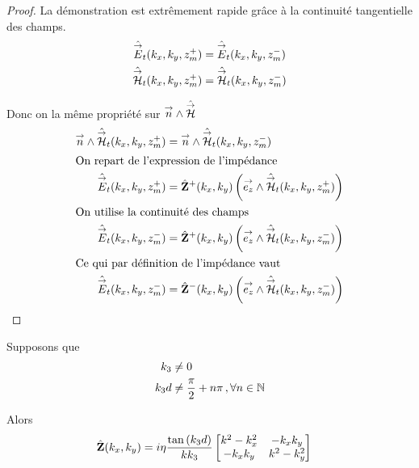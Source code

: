         \begin{proof}
            La démonstration est extrêmement rapide grâce à la continuité tangentielle des champs.
            \begin{align}
                \hat{{\overset{\rightarrow}{E}}}_t(k_x,k_y,z_m^+) &= \hat{{\overset{\rightarrow}{E}}}_t(k_x,k_y,z_m^-)
                \\
                \hat{{\overset{\rightarrow}{\mathcal{H}}}}_t(k_x,k_y,z_m^+) &= \hat{{\overset{\rightarrow}{\mathcal{H}}}}_t(k_x,k_y,z_m^-)
            \end{align}

            Donc on la même propriété sur \({\overset{\rightarrow}{n}} \wedge \hat{{\overset{\rightarrow}{\mathcal{H}}}}\)
            \begin{align}                
                {\overset{\rightarrow}{n}} \wedge \hat{{\overset{\rightarrow}{\mathcal{H}}}}_t(k_x,k_y,z_m^+) &= {\overset{\rightarrow}{n}} \wedge \hat{{\overset{\rightarrow}{\mathcal{H}}}}_t(k_x,k_y,z_m^-)
                \\
                \intertext{On repart de l'expression de l'impédance}
                \hat{{\overset{\rightarrow}{E}}}_t(k_x,k_y,z_m^+) &= \hat{\mathbf{Z}}^+(k_x,k_y) \left({\overset{\rightarrow}{e_z}} \wedge \hat{{\overset{\rightarrow}{\mathcal{H}}}}_t(k_x,k_y,z_m^+)\right)
                \\
                \intertext{On utilise la continuité des champs}
                \hat{{\overset{\rightarrow}{E}}}_t(k_x,k_y,z_m^-) &= \hat{\mathbf{Z}}^+(k_x,k_y) \left({\overset{\rightarrow}{e_z}} \wedge \hat{{\overset{\rightarrow}{\mathcal{H}}}}_t(k_x,k_y,z_m^-)\right)
                \\
                \intertext{Ce qui par définition de l'impédance vaut}
                \hat{{\overset{\rightarrow}{E}}}_t(k_x,k_y,z_m^-) &= \hat{\mathbf{Z}}^-(k_x,k_y) \left({\overset{\rightarrow}{e_z}} \wedge \hat{{\overset{\rightarrow}{\mathcal{H}}}}_t(k_x,k_y,z_m^-)\right)
            \end{align}
        \end{proof}

        \begin{thm}
            Supposons que
            \begin{subequations}
                \label{eq:imp_fourier:plan:hyp_1_c}
                \begin{align}
                    k_3     & \not = 0 \\
                    k_3d    & \not = \dfrac{\pi}{2}+n\pi\,, \forall n \in \mathbb N
                \end{align}
            \end{subequations}

            Alors
            \begin{align}
            \label{eq:imp_plan:symb_z:1c}
            \hat {\mathbf{Z}}(k_x,k_y) &= i\eta\dfrac{\tan\left(k_3d\right)}{kk_3}
                \begin{bmatrix}
                   k^2-k_x^2  & -k_xk_y\\
                    -k_xk_y & k^2-k_y^2\\
                \end{bmatrix}
            \end{align}
        \end{thm}

